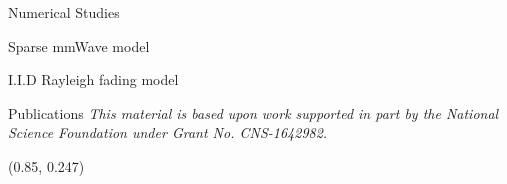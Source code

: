 \documentclass[pdf]{beamer}
\begin{document}
\begin{frame}[t]
\begin{textblock}{0.98}
\begin{tcbraster}[%
    raster columns = 2,
    raster column skip = 0.01\paperwidth,
    raster row skip = 0.01\paperwidth,
    raster equal height=rows
    ]
\begin{mybox}[sidebyside=false]{Numerical Studies}
\begin{tcbraster}[%
        raster columns=2,
        raster valign=center,
        ]
        \begin{tcolorbox}[blankest]
          \resizebox{\textwidth}{!}{}
        \end{tcolorbox}
        \begin{tcolorbox}[blankest]
          \resizebox{\textwidth}{!}{}
        \end{tcolorbox}
        \begin{tcolorbox}[blankest]
          \footnotesize\centering
          Sparse mmWave model
        \end{tcolorbox}
        \begin{tcolorbox}[blankest]
          \footnotesize\centering
          I.I.D Rayleigh fading model
        \end{tcolorbox}
      \end{tcbraster}
  \end{mybox}

  \begin{mybox}[%
    raster multicolumn=2,
    sidebyside=false,
    halign lower=right,
    ]{Publications}
    \small
    \nocite{*}
    \printbibliography
    \tcblower
    \scriptsize
    \emph{This material is based upon work supported in part by the National Science Foundation under Grant No. CNS-1642982.}
  \end{mybox}
  \end{tcbraster}
\end{textblock}

\begin{textblock}{0.02}(0.85, 0.247)
  \flushright
  \resizebox{2in}{!}{}
\end{textblock}
\end{frame}
\end{document}
